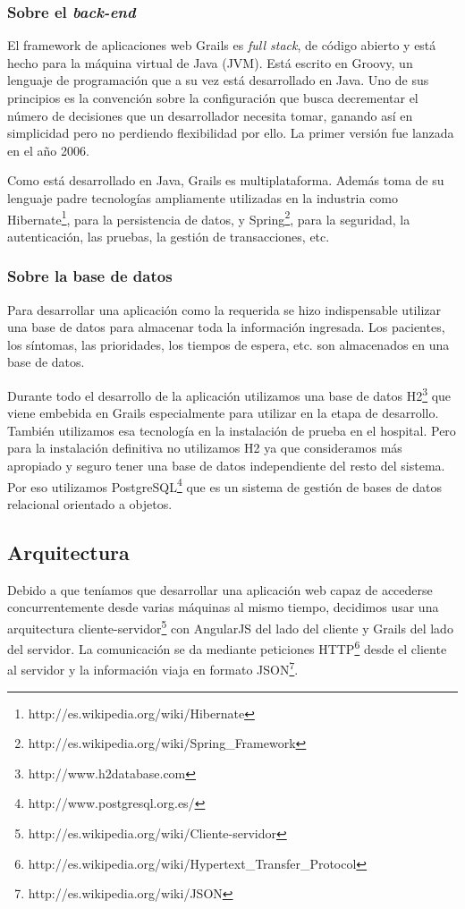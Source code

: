 \subsubsection{Sobre el \textit{back-end}}
El framework de aplicaciones web Grails es \textit{full stack}, de código abierto y está hecho para la máquina virtual de Java (JVM). Está escrito en Groovy, un lenguaje de programación que a su vez está desarrollado en Java. Uno de sus principios es la convención sobre la configuración que busca decrementar el número de decisiones que un desarrollador necesita tomar, ganando así en simplicidad pero no perdiendo flexibilidad por ello. La primer versión fue lanzada en el año 2006.

Como está desarrollado en Java, Grails es multiplataforma. Además toma de su lenguaje padre tecnologías ampliamente utilizadas en la industria como Hibernate\footnote{http://es.wikipedia.org/wiki/Hibernate}, para la persistencia de datos, y Spring\footnote{http://es.wikipedia.org/wiki/Spring\_Framework}, para la seguridad, la autenticación, las pruebas, la gestión de transacciones, etc.

\subsubsection{Sobre la base de datos}
Para desarrollar una aplicación como la requerida se hizo indispensable utilizar una base de datos para almacenar toda la información ingresada. Los pacientes, los síntomas, las prioridades, los tiempos de espera, etc. son almacenados en una base de datos.

Durante todo el desarrollo de la aplicación utilizamos una base de datos H2\footnote{http://www.h2database.com} que viene embebida en Grails especialmente para utilizar en la etapa de desarrollo. También utilizamos esa tecnología en la instalación de prueba en el hospital. Pero para la instalación definitiva no utilizamos H2 ya que consideramos más apropiado y seguro tener una base de datos independiente del resto del sistema. Por eso utilizamos PostgreSQL\footnote{http://www.postgresql.org.es/} que es un sistema de gestión de bases de datos relacional orientado a objetos.


\subsection{Arquitectura}
Debido a que teníamos que desarrollar una aplicación web capaz de accederse concurrentemente desde varias máquinas al mismo tiempo, decidimos usar una arquitectura cliente-servidor\footnote{http://es.wikipedia.org/wiki/Cliente-servidor} con AngularJS del lado del cliente y Grails del lado del servidor. La comunicación se da mediante peticiones HTTP\footnote{http://es.wikipedia.org/wiki/Hypertext\_Transfer\_Protocol} desde el cliente al servidor y la información viaja en formato JSON\footnote{http://es.wikipedia.org/wiki/JSON}.


